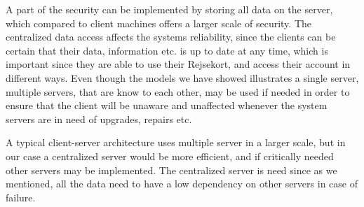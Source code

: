 A part of the security can be implemented by storing all data on the server, which compared to client machines offers a larger scale of security.
The centralized data access affects the systems reliability, since the clients can be certain that their data, information  etc. is up to date at any time, which is important since they are able to use their Rejsekort, and access their account in different ways. Even though the models we have showed illustrates a single server, multiple servers, that are know to each other, may be used if needed in order to ensure that the client will be unaware and unaffected whenever the system servers are in need of upgrades, repairs etc.


A typical client-server architecture uses multiple server in a larger scale, but in our case a centralized server would be more efficient, and if critically needed other servers may be implemented. The centralized server is need since as we mentioned, all the data need to have a low dependency on other servers in case of failure.